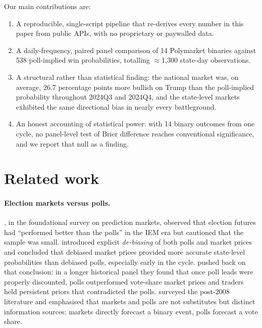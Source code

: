\documentclass{article}
\begin{document}
Our main contributions are:
\begin{enumerate}
\item A reproducible, single-script pipeline that re-derives every
  number in this paper from public APIs, with no proprietary or paywalled
  data.
\item A daily-frequency, paired panel comparison of 14 Polymarket binaries
  against 538 poll-implied win probabilities, totalling $\approx$1{,}300
  state-day observations.
\item A structural rather than statistical finding: the national market
  was, on average, 26.7 percentage points more bullish on Trump than the
  poll-implied probability throughout 2024Q3 and 2024Q4, and the
  state-level markets exhibited the same directional bias in nearly every
  battleground.
\item An honest accounting of statistical power: with 14 binary outcomes
  from one cycle, no panel-level test of Brier difference reaches
  conventional significance, and we report that null as a finding.
\end{enumerate}

\section{Related work}
\label{sec:related}

\paragraph{Election markets versus polls.}
\citet{wolfers2004prediction}, in the foundational survey on prediction
markets, observed that election futures had ``performed better than the
polls'' in the IEM era but cautioned that the sample was small.
\citet{rothschild2009forecasting} introduced explicit \emph{de-biasing} of
both polls and market prices and concluded that debiased market prices
provided more accurate state-level probabilities than debiased polls,
especially early in the cycle. \citet{erikson2012markets} pushed back on
that conclusion: in a longer historical panel they found that once poll
leads were properly discounted, polls outperformed vote-share market
prices and traders held persistent priors that contradicted the polls.
\citet{snowberg2013prediction} surveyed the post-2008 literature and
emphasised that markets and polls are not substitutes but distinct
information sources: markets directly forecast a binary event, polls
forecast a vote share.
\end{document}
